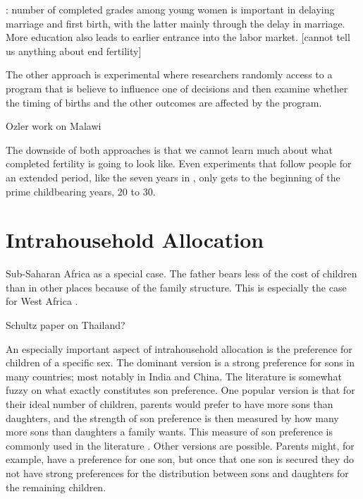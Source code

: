 \documentclass[letterpaper,12pt]{article}
\begin{document}
\citet{Marchetta2016}: number of completed grades among young women is
important in delaying marriage and first birth, with the latter mainly
through the delay in marriage.
More education also leads to earlier entrance into the labor market.
[cannot tell us anything about end fertility]

The other approach is experimental where researchers randomly access
to a program that is believe to influence one of decisions 
and then examine whether the timing of births and the other outcomes 
are affected by the program.


\citet{Duflo2015}

\citet{Dupas2017}

Ozler work on Malawi


The downside of both approaches is that we cannot learn
much about what completed fertility is going to look like.
Even experiments that follow people for an extended period,
like the seven years in \citet{Duflo2015}, only gets to
the beginning of the prime childbearing years, 20 to 30.


\citet{wolpin84}



\section{Intrahousehold Allocation}

Sub-Saharan Africa as a special case.
The father bears less of the cost of children than
in other places because of the family structure.
This is especially the case for West Africa \citep{Caldwell1992}.

Schultz paper on Thailand?

\citet{Ashraf2014}

\citep{Rasul2008}

\citep{Field2016}


An especially important aspect of intrahousehold allocation is
the preference for children of a specific sex.
The dominant version is a strong preference for sons
in many countries; most notably in India and China.
The literature is somewhat fuzzy on what exactly 
constitutes son preference.
One popular version is that for their ideal number of children, parents 
would prefer to have more sons than daughters, and the strength of son
preference is then measured by how many more sons than daughters a family wants.
This measure of son preference is commonly used in the literature 
\citep[See, for example,]{clark00,Jensen2009,Hu2015}.
Other versions are possible.
Parents might, for example, have a preference for one son, but
once that one son is secured they do not have strong preferences for
the distribution between sons and daughters for the remaining children.
\end{document}
